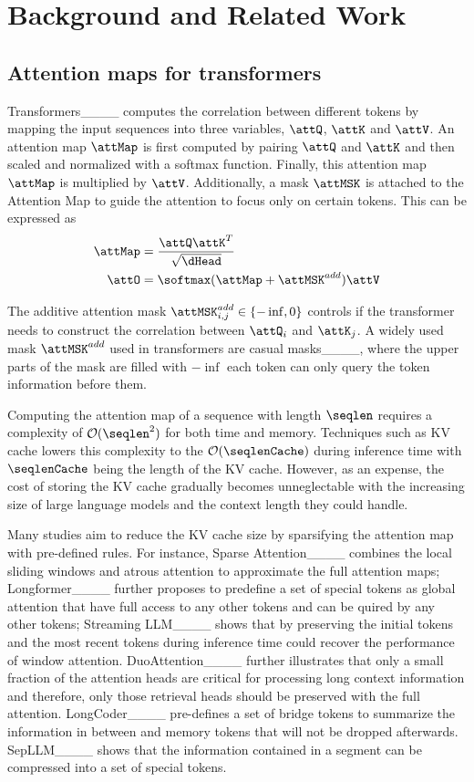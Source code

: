 \section{Background and Related Work}
\subsection{Attention maps for transformers~\label{sec:attmap}}
Transformers____ computes the correlation between different tokens by mapping the input sequences into three variables, $\attQ$, $\attK$ and $\attV$. An attention map $\attMap$ is first computed by pairing $\attQ$ and $\attK$ and then scaled and normalized with a softmax function. Finally, this attention map $\attMap$ is multiplied by $\attV$. Additionally, a mask $\attMSK$ is attached to the Attention Map to guide the attention to focus only on certain tokens. This can be expressed as 
\begin{align}
    \attMap & = \frac{\attQ\attK^T}{\sqrt{\dHead}}\label{eq:attmap}\\
    \attO & = \softmax(\attMap  + \attMSK^{add})\attV\label{eq:attout}
\end{align}

The additive attention mask $\attMSK^{add}_{i,j} \in \{ -\inf, 0 \}$ controls if the transformer needs to construct the correlation between $\attQ_i$ and $\attK_{j}$.  A widely used mask $\attMSK^{add}$ used in transformers are casual masks____, where the upper parts of the mask are filled with $-\inf$ each token can only query the token information before them. 

Computing the attention map of a sequence with length $\seqlen$ requires a complexity of $\mathcal{O}(\seqlen^2)$ for both time and memory. Techniques such as KV cache lowers this complexity to the $\mathcal{O}(\seqlenCache)$ during inference time with  $\seqlenCache$ being the length of the KV cache. However, as an expense, the cost of storing the KV cache gradually becomes unneglectable with the increasing size of large language models and the context length they could handle. 

Many studies aim to reduce the KV cache size by sparsifying the attention map with pre-defined rules. For instance, Sparse Attention____ combines the local sliding windows and atrous attention to approximate the full attention maps; Longformer____ further proposes to predefine a set of special tokens as global attention that have full access to any other tokens and can be quired by any other tokens; Streaming LLM____ shows that by preserving the initial tokens and the most recent tokens during inference time could recover the performance of window attention. DuoAttention____ further illustrates that only a small fraction of the attention heads are critical for processing long context information and therefore, only those retrieval heads should be preserved with the full attention. LongCoder____ pre-defines a set of bridge tokens to summarize the information in between and memory tokens that will not be dropped afterwards. SepLLM____ shows that the information contained in a segment can be compressed into a set of special tokens. 

